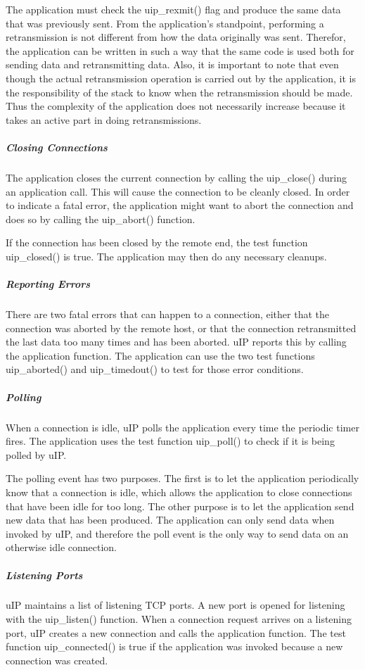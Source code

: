 \-The application must check the uip\-\_\-rexmit() flag and produce the same data that was previously sent. \-From the application's standpoint, performing a retransmission is not different from how the data originally was sent. \-Therefor, the application can be written in such a way that the same code is used both for sending data and retransmitting data. \-Also, it is important to note that even though the actual retransmission operation is carried out by the application, it is the responsibility of the stack to know when the retransmission should be made. \-Thus the complexity of the application does not necessarily increase because it takes an active part in doing retransmissions.\hypertarget{a00060_closing}{}\subparagraph{\-Closing Connections}\label{a00060_closing}
\-The application closes the current connection by calling the uip\-\_\-close() during an application call. \-This will cause the connection to be cleanly closed. \-In order to indicate a fatal error, the application might want to abort the connection and does so by calling the uip\-\_\-abort() function.

\-If the connection has been closed by the remote end, the test function uip\-\_\-closed() is true. \-The application may then do any necessary cleanups.\hypertarget{a00060_errors}{}\subparagraph{\-Reporting Errors}\label{a00060_errors}
\-There are two fatal errors that can happen to a connection, either that the connection was aborted by the remote host, or that the connection retransmitted the last data too many times and has been aborted. u\-I\-P reports this by calling the application function. \-The application can use the two test functions uip\-\_\-aborted() and uip\-\_\-timedout() to test for those error conditions.\hypertarget{a00060_polling}{}\subparagraph{\-Polling}\label{a00060_polling}
\-When a connection is idle, u\-I\-P polls the application every time the periodic timer fires. \-The application uses the test function uip\-\_\-poll() to check if it is being polled by u\-I\-P.

\-The polling event has two purposes. \-The first is to let the application periodically know that a connection is idle, which allows the application to close connections that have been idle for too long. \-The other purpose is to let the application send new data that has been produced. \-The application can only send data when invoked by u\-I\-P, and therefore the poll event is the only way to send data on an otherwise idle connection.\hypertarget{a00060_listen}{}\subparagraph{\-Listening Ports}\label{a00060_listen}
u\-I\-P maintains a list of listening \-T\-C\-P ports. \-A new port is opened for listening with the uip\-\_\-listen() function. \-When a connection request arrives on a listening port, u\-I\-P creates a new connection and calls the application function. \-The test function uip\-\_\-connected() is true if the application was invoked because a new connection was created.

